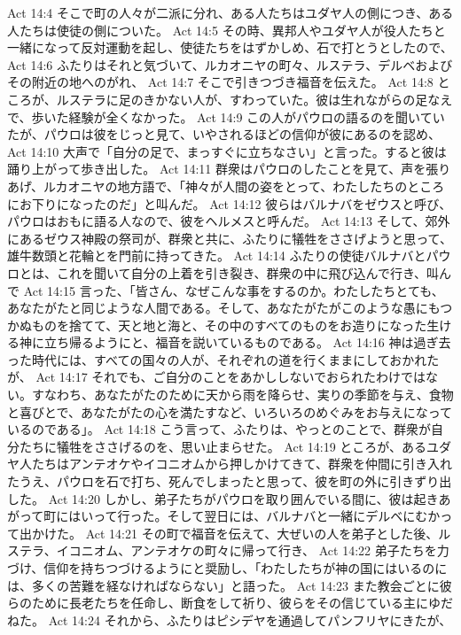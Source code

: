 Act 14:4  そこで町の人々が二派に分れ、ある人たちはユダヤ人の側につき、ある人たちは使徒の側についた。
Act 14:5  その時、異邦人やユダヤ人が役人たちと一緒になって反対運動を起し、使徒たちをはずかしめ、石で打とうとしたので、
Act 14:6  ふたりはそれと気づいて、ルカオニヤの町々、ルステラ、デルベおよびその附近の地へのがれ、
Act 14:7  そこで引きつづき福音を伝えた。
Act 14:8  ところが、ルステラに足のきかない人が、すわっていた。彼は生れながらの足なえで、歩いた経験が全くなかった。
Act 14:9  この人がパウロの語るのを聞いていたが、パウロは彼をじっと見て、いやされるほどの信仰が彼にあるのを認め、
Act 14:10  大声で「自分の足で、まっすぐに立ちなさい」と言った。すると彼は踊り上がって歩き出した。
Act 14:11  群衆はパウロのしたことを見て、声を張りあげ、ルカオニヤの地方語で、「神々が人間の姿をとって、わたしたちのところにお下りになったのだ」と叫んだ。
Act 14:12  彼らはバルナバをゼウスと呼び、パウロはおもに語る人なので、彼をヘルメスと呼んだ。
Act 14:13  そして、郊外にあるゼウス神殿の祭司が、群衆と共に、ふたりに犠牲をささげようと思って、雄牛数頭と花輪とを門前に持ってきた。
Act 14:14  ふたりの使徒バルナバとパウロとは、これを聞いて自分の上着を引き裂き、群衆の中に飛び込んで行き、叫んで
Act 14:15  言った、「皆さん、なぜこんな事をするのか。わたしたちとても、あなたがたと同じような人間である。そして、あなたがたがこのような愚にもつかぬものを捨てて、天と地と海と、その中のすべてのものをお造りになった生ける神に立ち帰るようにと、福音を説いているものである。
Act 14:16  神は過ぎ去った時代には、すべての国々の人が、それぞれの道を行くままにしておかれたが、
Act 14:17  それでも、ご自分のことをあかししないでおられたわけではない。すなわち、あなたがたのために天から雨を降らせ、実りの季節を与え、食物と喜びとで、あなたがたの心を満たすなど、いろいろのめぐみをお与えになっているのである」。
Act 14:18  こう言って、ふたりは、やっとのことで、群衆が自分たちに犠牲をささげるのを、思い止まらせた。
Act 14:19  ところが、あるユダヤ人たちはアンテオケやイコニオムから押しかけてきて、群衆を仲間に引き入れたうえ、パウロを石で打ち、死んでしまったと思って、彼を町の外に引きずり出した。
Act 14:20  しかし、弟子たちがパウロを取り囲んでいる間に、彼は起きあがって町にはいって行った。そして翌日には、バルナバと一緒にデルベにむかって出かけた。
Act 14:21  その町で福音を伝えて、大ぜいの人を弟子とした後、ルステラ、イコニオム、アンテオケの町々に帰って行き、
Act 14:22  弟子たちを力づけ、信仰を持ちつづけるようにと奨励し、「わたしたちが神の国にはいるのには、多くの苦難を経なければならない」と語った。
Act 14:23  また教会ごとに彼らのために長老たちを任命し、断食をして祈り、彼らをその信じている主にゆだねた。
Act 14:24  それから、ふたりはピシデヤを通過してパンフリヤにきたが、
